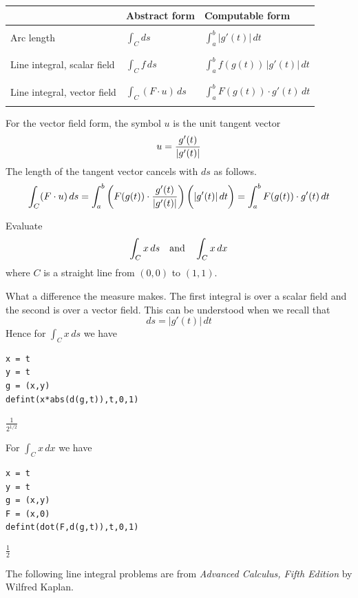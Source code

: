 \begin{center}
\begin{tabular}{|l|l|l|}
\hline
& Abstract form
& Computable form
\\
\hline
 & &\\
Arc length
& $\displaystyle{\int_C ds}$
& $\displaystyle{\int_a^b |g'(t)|\,dt}$\\
 & &\\
\hline
 & & \\
Line integral, scalar field
& $\displaystyle{\int_C f\,ds}$
& $\displaystyle{\int_a^b f(g(t))\,|g'(t)|\,dt}$\\
& &\\
\hline
 & & \\
Line integral, vector field
& $\displaystyle{\int_C(F\cdot u)\,ds}$
& $\displaystyle{\int_a^b F(g(t))\cdot g'(t)\,dt}$\\
 & & \\
\hline
\end{tabular}
\end{center}

For the vector field form, the symbol $u$ is the unit tangent vector
$$u={g'(t)\over|g'(t)|}$$
The length of the tangent vector cancels with $ds$
as follows.
$$\int_C(F\cdot u)\,ds
=\int_a^b\bigg(F(g(t))\cdot{g'(t)\over|g'(t)|}\bigg)\,\bigg(|g'(t)|\,dt\bigg)
=\int_a^b F(g(t))\cdot g'(t)\,dt
$$

Evaluate
$$\int_Cx\,ds\quad\hbox{and}\quad\int_Cx\,dx$$
where $C$ is a straight line from $(0,0)$ to $(1,1)$.

What a difference the measure makes.
The first integral is over a scalar field and the second is over a vector field.
This can be understood when we recall that
$$ds=|g'(t)|\,dt
$$
Hence for $\int_Cx\,ds$ we have

\begin{Verbatim}[formatcom=\color{blue},samepage=true]
x = t
y = t
g = (x,y)
defint(x*abs(d(g,t)),t,0,1)
\end{Verbatim}

$\displaystyle \frac{1}{2^{1/2}}$

For $\int_Cx\,dx$ we have

\begin{Verbatim}[formatcom=\color{blue},samepage=true]
x = t
y = t
g = (x,y)
F = (x,0)
defint(dot(F,d(g,t)),t,0,1)
\end{Verbatim}

$\displaystyle \frac{1}{2}$

The following line integral problems are from
{\it Advanced Calculus, Fifth Edition} by Wilfred Kaplan.

